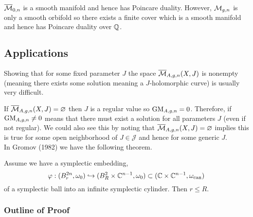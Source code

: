 \documentclass[12pt]{article}
\begin{document}
\begin{rmk}
$\overline{\mathcal{M}}_{0,n}$ is a smooth manifold and hence has Poincare duality. However, $\mathcal{M}_{g,n}$ is only a smooth orbifold so there exists a finite cover which is a smooth manifold and hence has Poincare duality over $\mathbb{Q}$. 
\end{rmk}

\subsection{Applications}

\begin{rmk}
Showing that for some fixed parameter $J$ the space $\overline{\mathcal{M}}_{A,g,n}(X,J)$ is nonempty (meaning there exists some solution meaning a $J$-holomorphic curve) is usually very difficult. 
\end{rmk}

If $\overline{\mathcal{M}}_{A,g,n}(X,J) = \varnothing$ then $J$ is a regular value so $\mathrm{GM}_{A,g,n} = 0$. Therefore, if $\mathrm{GM}_{A,g,n} \neq 0$ means that there must exist a solution for all parameters $J$ (even if not regular). We could also see this by noting that $\overline{\mathcal{M}}_{A,g,n}(X,J) = \varnothing$ implies this is true for some open neighborhood of $J \in \mathcal{J}$ and hence for some generic $J$. 
\bigskip\\
In Gromov (1982) we have the following theorem.

\begin{theorem}[Nonsqueezing]
Assume we have a symplectic embedding, 
\[ \varphi : (B^{2n}_r, \omega_0) \hookrightarrow (B^2_R \times \mathbb{C}^{n-1}, \omega_0) \subset (\mathbb{C} \times \mathbb{C}^{n-1}, \omega_{\text{can}}) \]
of a symplectic ball into an infinite symplectic cylinder. Then $r \le R$. 
\end{theorem}

\subsubsection{Outline of Proof}
\end{document}
